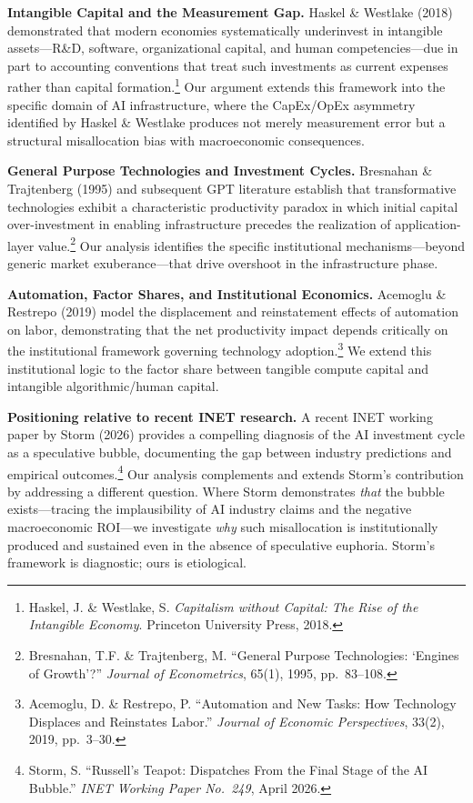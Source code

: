\documentclass[11pt,letterpaper]{article}
\begin{document}
\textbf{Intangible Capital and the Measurement Gap.} Haskel \& Westlake (2018) demonstrated that modern economies systematically underinvest in intangible assets---R\&D, software, organizational capital, and human competencies---due in part to accounting conventions that treat such investments as current expenses rather than capital formation.\footnote{Haskel, J. \& Westlake, S. \textit{Capitalism without Capital: The Rise of the Intangible Economy}. Princeton University Press, 2018.} Our argument extends this framework into the specific domain of AI infrastructure, where the CapEx/OpEx asymmetry identified by Haskel \& Westlake produces not merely measurement error but a structural misallocation bias with macroeconomic consequences.

\textbf{General Purpose Technologies and Investment Cycles.} Bresnahan \& Trajtenberg (1995) and subsequent GPT literature establish that transformative technologies exhibit a characteristic productivity paradox in which initial capital over-investment in enabling infrastructure precedes the realization of application-layer value.\footnote{Bresnahan, T.F. \& Trajtenberg, M. ``General Purpose Technologies: `Engines of Growth'?'' \textit{Journal of Econometrics}, 65(1), 1995, pp.~83--108.} Our analysis identifies the specific institutional mechanisms---beyond generic market exuberance---that drive overshoot in the infrastructure phase.

\textbf{Automation, Factor Shares, and Institutional Economics.} Acemoglu \& Restrepo (2019) model the displacement and reinstatement effects of automation on labor, demonstrating that the net productivity impact depends critically on the institutional framework governing technology adoption.\footnote{Acemoglu, D. \& Restrepo, P. ``Automation and New Tasks: How Technology Displaces and Reinstates Labor.'' \textit{Journal of Economic Perspectives}, 33(2), 2019, pp.~3--30.} We extend this institutional logic to the factor share between tangible compute capital and intangible algorithmic/human capital.

\textbf{Positioning relative to recent INET research.} A recent INET working paper by Storm (2026) provides a compelling diagnosis of the AI investment cycle as a speculative bubble, documenting the gap between industry predictions and empirical outcomes.\footnote{Storm, S. ``Russell's Teapot: Dispatches From the Final Stage of the AI Bubble.'' \textit{INET Working Paper No.~249}, April 2026.} Our analysis complements and extends Storm's contribution by addressing a different question. Where Storm demonstrates \textit{that} the bubble exists---tracing the implausibility of AI industry claims and the negative macroeconomic ROI---we investigate \textit{why} such misallocation is institutionally produced and sustained even in the absence of speculative euphoria. Storm's framework is diagnostic; ours is etiological.
\end{document}
